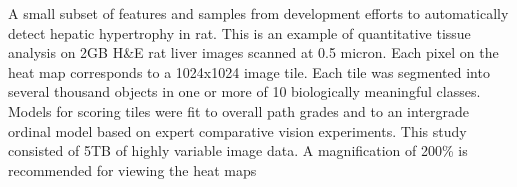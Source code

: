 A small subset of features and samples from development efforts to automatically detect hepatic hypertrophy in rat. This is an example of quantitative tissue analysis on 2GB H\&E rat liver images scanned at 0.5 micron. Each pixel on the heat map corresponds to a 1024x1024 image tile. Each tile was segmented into several thousand objects in one or more of 10
biologically meaningful classes. Models for scoring tiles were fit to overall path grades and to an intergrade ordinal model based on expert comparative vision experiments. This study consisted of 5TB of highly variable image data. A magnification of 200\% is recommended for viewing the heat maps
